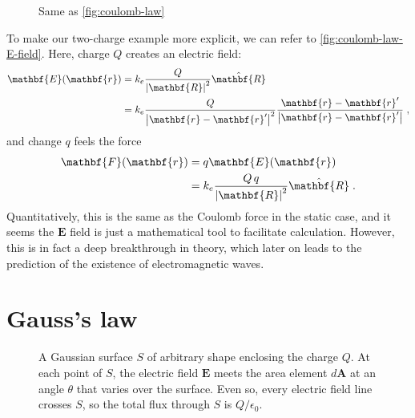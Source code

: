 \documentclass[../book.tex]{subfiles}
\begin{document}
\begin{figure}[htbp]
  \centering
  \caption{Same as \autoref{fig:coulomb-law}}
  \label{fig:coulomb-law-E-field}
\end{figure}

To make our two-charge example more explicit, we can refer to \autoref{fig:coulomb-law-E-field}. Here, charge $Q$ creates an electric field:
\begin{align}
    \label{eq:coulomb-law-E-field}
    \mathbf{E}(\mathbf{r})
    &=
    k_e 
    \frac{Q}{\abs{\mathbf{R}}^2}
    \hat{\mathbf{R}}
    \\
    &=
    k_e 
    \frac{Q}{\abs{\mathbf{r} - \mathbf{r}'}^2}
    \frac{\mathbf{r} - \mathbf{r}'}{\abs{\mathbf{r} - \mathbf{r}'}}
    \;,
\end{align}
and change $q$ feels the force
\begin{align}
    \mathbf{F}(\mathbf{r})
    &=
    q \mathbf{E}(\mathbf{r})
    \\
    &=
    k_e 
    \frac{Q \, q}{\abs{\mathbf{R}}^2}
    \hat{\mathbf{R}}
    \;.
\end{align}
Quantitatively, this is the same as the Coulomb force in the static case, and it seems the $\mathbf{E}$ field is just a mathematical tool to facilitate calculation. However, this is in fact a deep breakthrough in theory, which later on leads to the prediction of the existence of electromagnetic waves.


\section{Gauss's law}

\begin{figure}[htbp]
    \centering
    \caption{A Gaussian surface $S$ of arbitrary shape enclosing the charge $Q$.
    At each point of $S$, the electric field $\mathbf{E}$ meets the area element
    $d\mathbf{A}$ at an angle $\theta$ that varies over the surface. Even so,
    every electric field line crosses $S$, so the total flux through $S$ is
    $Q/\epsilon_0$.}
    \label{fig:gauss-surface-arbitrary}
\end{figure}
\end{document}
